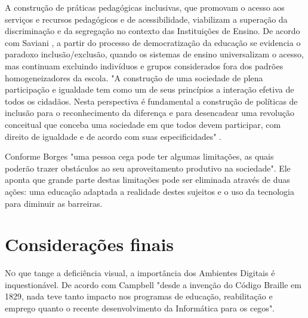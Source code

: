 A construção de práticas pedagógicas inclusivas, que promovam o acesso aos serviços e recursos pedagógicos e de acessibilidade, viabilizam a superação da discriminação e da segregação no contexto das Instituições de Ensino. De acordo com Saviani \cite{saviani2003pedagogia}, a partir do processo de democratização da educação se evidencia o paradoxo inclusão/exclusão, quando os sistemas de ensino universalizam o acesso, mas continuam excluindo indivíduos e grupos considerados fora dos padrões homogeneizadores da escola. "A construção de uma sociedade de plena participação e igualdade tem como um de seus princípios a interação efetiva de todos os cidadãos. Nesta perspectiva é fundamental a construção de políticas de inclusão para o reconhecimento da diferença e para desencadear uma revolução conceitual que conceba uma sociedade em que todos devem participar, com direito de igualdade e de acordo com suas especificidades" \cite{conforto2002acessibilidade}.

Conforme Borges \cite{borges1996dosvox} "uma pessoa cega pode ter algumas limitações, as quais poderão trazer obstáculos ao seu aproveitamento produtivo na sociedade". Ele aponta que grande parte destas limitações pode ser eliminada através de duas ações: uma educação adaptada a realidade destes sujeitos e o uso da tecnologia para diminuir as barreiras.

\section{Considerações finais}
\lettrine{N}{o} que tange a deficiência visual, a importância dos Ambientes Digitais é inquestionável. De acordo com Campbell \cite{campbell2001trabalho} "desde a invenção do Código Braille em 1829, nada teve tanto impacto nos programas de educação, reabilitação e emprego quanto o recente desenvolvimento da Informática para os cegos".